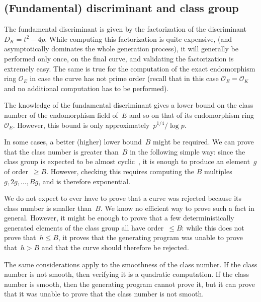 \documentclass[twocolumn,letterpaper,10pt]{article}
\let\ro\mathcal
\begin{document}
\subsection{(Fundamental) discriminant and class group}

The fundamental discriminant is given by
the factorization of the discriminant~$D_K = t^2 - 4 p$.
While computing this factorization is quite expensive,
(and asymptotically dominates the whole generation process),
it will generally be performed only once, on the final curve,
and validating the factorization is extremely easy.
The same is true for the computation of the exact endomorphism
ring $\ro O_E$ in case the curve has not prime order (recall that
in this case $\ro O_E = \ro O_K$ and no additional computation has
to be performed).

The knowledge of the fundamental discriminant gives a lower bound
on the class number of the endomorphism field of~$E$
and so on that of its endomorphism ring~$\ro O_E$.
However, this bound is only approximately~$p^{1/4}/\log p$.

\smallskip

In some cases, a better (higher) lower bound~$B$ might be required.
We can prove that the class number is greater than~$B$
in the following simple way:
since the class group is expected to be almost cyclic~\cite{nt1984cl},
it is enough to produce an element~$g$ of order~$≥ B$.
However, checking this requires
computing the $B$ multiples~$g, 2g, …, B g$,
and is therefore exponential.

We do not expect to ever have to prove that a curve was rejected
because its class number is smaller than~$B$.
We know no efficient way to prove such a fact in general.
However, it might be enough to prove
that a few deterministically generated elements of the class group
all have order~$≤ B$:
while this does not prove that~$h ≤ B$,
it proves that the generating program was unable to prove that~$h > B$
and that the curve should therefore be rejected.

\smallskip

The same considerations apply to the smoothness of the class number.
If the class number is not smooth, then
verifying it is a quadratic computation.
If the class number is smooth, then
the generating program cannot prove it,
but it can prove that it was unable to prove that
the class number is not smooth.



\end{document}
